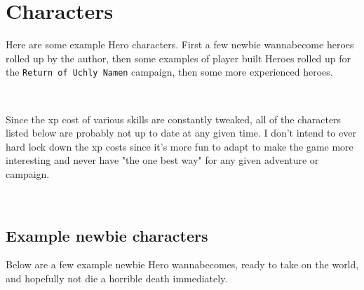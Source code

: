 

\cleardoublepage

\chapter*{Characters}
\label{cpt:characters}

Here are some example Hero characters. First a few newbie wannabecome heroes rolled up by the author, then some examples of player built Heroes rolled up for the \texttt{Return of Uchly Namen} campaign, then some more experienced heroes.

\

Since the xp cost of various skills are constantly tweaked, all of the characters listed below are probably not up to date at any given time. I don't intend to ever hard lock down the xp costs since it's more fun to adapt to make the game more interesting and never have "the one best way" for any given adventure or campaign.


\

\goodbreak
{} {}
\section*{Example newbie characters}

Below are a few example newbie Hero wannabecomes, ready to take on the world, and hopefully not die a horrible death immediately.

%
%






